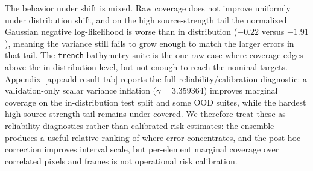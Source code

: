 The behavior under shift is mixed. Raw coverage does not improve uniformly under distribution shift, and on the high source-strength tail the normalized Gaussian negative log-likelihood is worse than in distribution ($-0.22$ versus $-1.91$), meaning the variance still fails to grow enough to match the larger errors in that tail. The \texttt{trench} bathymetry suite is the one raw case where coverage edges above the in-distribution level, but not enough to reach the nominal targets. Appendix~\ref{app:add-result-tab} reports the full reliability/calibration diagnostic: a validation-only scalar variance inflation ($\gamma = 3.359364$) improves marginal coverage on the in-distribution test split and some OOD suites, while the hardest high source-strength tail remains under-covered. We therefore treat these as reliability diagnostics rather than calibrated risk estimates: the ensemble produces a useful relative ranking of where error concentrates, and the post-hoc correction improves interval scale, but per-element marginal coverage over correlated pixels and frames is not operational risk calibration.
